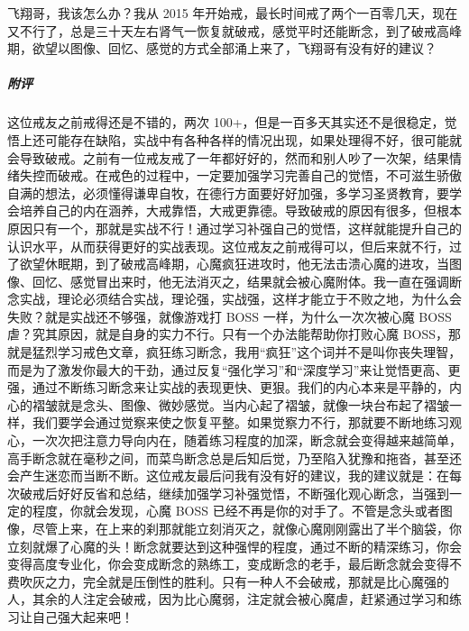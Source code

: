 \begin{case}
    飞翔哥，我该怎么办？我从 2015 年开始戒，最长时间戒了两个一百零几天，现在又不行了，总是三十天左右肾气一恢复就破戒，感觉平时还能断念，到了破戒高峰期，欲望以图像、回忆、感觉的方式全部涌上来了，飞翔哥有没有好的建议？
    \subparagraph{附评} 这位戒友之前戒得还是不错的，两次 100+，但是一百多天其实还不是很稳定，觉悟上还可能存在缺陷，实战中有各种各样的情况出现，如果处理得不好，很可能就会导致破戒。之前有一位戒友戒了一年都好好的，然而和别人吵了一次架，结果情绪失控而破戒。在戒色的过程中，一定要加强学习完善自己的觉悟，不可滋生骄傲自满的想法，必须懂得谦卑自牧，在德行方面要好好加强，多学习圣贤教育，要学会培养自己的内在涵养，大戒靠悟，大戒更靠德。导致破戒的原因有很多，但根本原因只有一个，那就是实战不行！通过学习补强自己的觉悟，这样就能提升自己的认识水平，从而获得更好的实战表现。这位戒友之前戒得可以，但后来就不行，过了欲望休眠期，到了破戒高峰期，心魔疯狂进攻时，他无法击溃心魔的进攻，当图像、回忆、感觉冒出来时，他无法消灭之，结果就会被心魔附体。我一直在强调断念实战，理论必须结合实战，理论强，实战强，这样才能立于不败之地，为什么会失败？就是实战还不够强，就像游戏打 BOSS 一样，为什么一次次被心魔 BOSS 虐？究其原因，就是自身的实力不行。只有一个办法能帮助你打败心魔 BOSS，那就是猛烈学习戒色文章，疯狂练习断念，我用“疯狂”这个词并不是叫你丧失理智，而是为了激发你最大的干劲，通过反复“强化学习”和“深度学习”来让觉悟更高、更强，通过不断练习断念来让实战的表现更快、更狠。我们的内心本来是平静的，内心的褶皱就是念头、图像、微妙感觉。当内心起了褶皱，就像一块台布起了褶皱一样，我们要学会通过觉察来使之恢复平整。如果觉察力不行，那就要不断地练习观心，一次次把注意力导向内在，随着练习程度的加深，断念就会变得越来越简单，高手断念就在毫秒之间，而菜鸟断念总是后知后觉，乃至陷入犹豫和拖沓，甚至还会产生迷恋而当断不断。这位戒友最后问我有没有好的建议，我的建议就是：在每次破戒后好好反省和总结，继续加强学习补强觉悟，不断强化观心断念，当强到一定的程度，你就会发现，心魔 BOSS 已经不再是你的对手了。不管是念头或者图像，尽管上来，在上来的刹那就能立刻消灭之，就像心魔刚刚露出了半个脑袋，你立刻就爆了心魔的头！断念就要达到这种强悍的程度，通过不断的精深练习，你会变得高度专业化，你会变成断念的熟练工，变成断念的老手，最后断念就会变得不费吹灰之力，完全就是压倒性的胜利。只有一种人不会破戒，那就是比心魔强的人，其余的人注定会破戒，因为比心魔弱，注定就会被心魔虐，赶紧通过学习和练习让自己强大起来吧！
\end{case}

